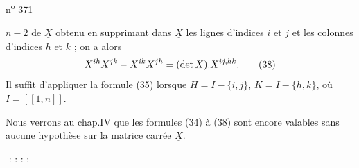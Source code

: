 \hfill n\textsuperscript{o} 371

$n-2$ \uline{de} $\underline{X}$ \uline{obtenu en supprimant dans} $\underline{X}$ \uline{les lignes d'indices} $i$ \uline{et} $j$ \uline{et les colonnes d'indices} $h$ \uline{et} $k$ ; \uline{on a alors}
\[
\csname tagsleft@true\endcsname
X^{ih}X^{jk}-X^{ik}X^{jh}=(\det\underline{X}).X^{ij,hk}.\tag*{(38)}
\]
Il suffit d'appliquer la formule (35) lorsque $H=I-\{i,j\}$, $K=I-\{h,k\}$, où $I=[\![1,n]\!]$.

Nous verrons au chap.IV que les formules (34) à (38) sont encore valables sans aucune hypothèse sur la matrice carrée $\underline{X}$.

\begin{center}
-:-:-:-:-
\end{center}
